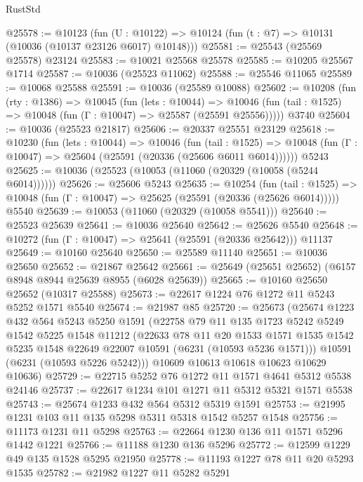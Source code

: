 \begin{lexlean}{RustStd}
\begin{coremodule}
{{@25578 := @10123
    (fun (U : @10122) => @10124 (fun (t : @7) => @10131 (@10036 (@10137 @23126 @6017) @10148)))
@25581 := @25543 (@25569 @25578) @23124
@25583 := @10021 @25568 @25578
@25585 := @10205 @25567 @1714
@25587 := @10036 (@25523 @11062)
@25588 := @25546 @11065
@25589 := @10068 @25588
@25591 := @10036 (@25589 @10088)
@25602 := @10208
    (fun (rty : @1386) =>
    @10045
      (fun (lets : @10044) =>
      @10046 (fun (tail : @1525) => @10048 (fun (Γ : @10047) => @25587 (@25591 @25556)))))
    @3740
@25604 := @10036 (@25523 @21817)
@25606 := @20337 @25551 @23129
@25618 := @10230
    (fun (lets : @10044) =>
    @10046
      (fun (tail : @1525) =>
      @10048 (fun (Γ : @10047) => @25604 (@25591 (@20336 (@25606 @6011 @6014))))))
    @5243
@25625 := @10036 (@25523 (@10053 (@11060 (@20329 (@10058 (@5244 @6014))))))
@25626 := @25606 @5243
@25635 := @10254
    (fun (tail : @1525) => @10048 (fun (Γ : @10047) => @25625 (@25591 (@20336 (@25626 @6014)))))
    @5540
@25639 := @10053 (@11060 (@20329 (@10058 @5541)))
@25640 := @25523 @25639
@25641 := @10036 @25640
@25642 := @25626 @5540
@25648 := @10272 (fun (Γ : @10047) => @25641 (@25591 (@20336 @25642))) @11137
@25649 := @10160 @25640
@25650 := @25589 @11140
@25651 := @10036 @25650
@25652 := @21867 @25642
@25661 := @25649 (@25651 @25652) (@6157 @8948 @8944 @25639 @8955 (@6028 @25639))
@25665 := @10160 @25650 @25652 (@10317 @25588)
@25673 := @22617 @1224 @76 @1272 @11 @5243 @5252 @1571 @5540
@25674 := @21987 @85
@25720 := @25673
    (@25674
      @1223
      @432
      @564
      @5243
      @5250
      @1591
      (@22758
        @79
        @11
        @135
        @1723
        @5242
        @5249
        @1542
        @5225
        @1548
        @11212
        (@22633
          @78
          @11
          @20
          @1533
          @1571
          @1535
          @1542
          @5235
          @1548
          @22649
          @22007
          @10591
          (@6231 (@10593 @5236 @1571)))
        @10591
        (@6231 (@10593 @5226 @5242)))
      @10609
      @10613
      @10618
      @10623
      @10629
      @10636)
@25729 := @22715 @5252 @76 @1272 @11 @1571 @4641 @5312 @5538 @24146
@25737 := @22617 @1234 @101 @1271 @11 @5312 @5321 @1571 @5538
@25743 := @25674 @1233 @432 @564 @5312 @5319 @1591
@25753 := @21995 @1231 @103 @11 @135 @5298 @5311 @5318 @1542 @5257 @1548
@25756 := @11173 @1231 @11 @5298
@25763 := @22664 @1230 @136 @11 @1571 @5296 @1442 @1221
@25766 := @11188 @1230 @136 @5296
@25772 := @12599 @1229 @49 @135 @1528 @5295 @21950
@25778 := @11193 @1227 @78 @11 @20 @5293 @1535
@25782 := @21982 @1227 @11 @5282 @5291
}}
\end{coremodule}
\end{lexlean}

